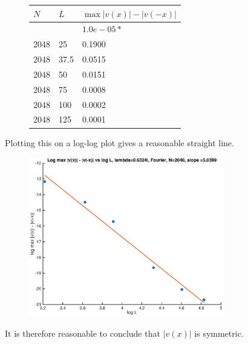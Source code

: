 \documentclass[12pt]{article}
\begin{document}
\begin{figure}[H]
\begin{tabular}{l|ll}
  $N$   &  $L$   & $\max{|v(x)| - |v(-x)|}$ \\ \hline
        &        & $1.0e-05 *$            \\
  2048  &    25  &   0.1900 \\ 
  2048  &  37.5  &   0.0515 \\
  2048  &    50  &   0.0151 \\ 
  2048  &    75  &   0.0008 \\
  2048  &   100  &   0.0002 \\
  2048  &   125  &   0.0001 \\
\end{tabular}
\end{figure}

Plotting this on a log-log plot gives a reasonable straight line.

\begin{figure}[H]
\includegraphics[width=8.5cm]{2doubleflipdiffloglogL}
\end{figure}
It is therefore reasonable to conclude that $|v(x)|$ is symmetric.
\end{document}
